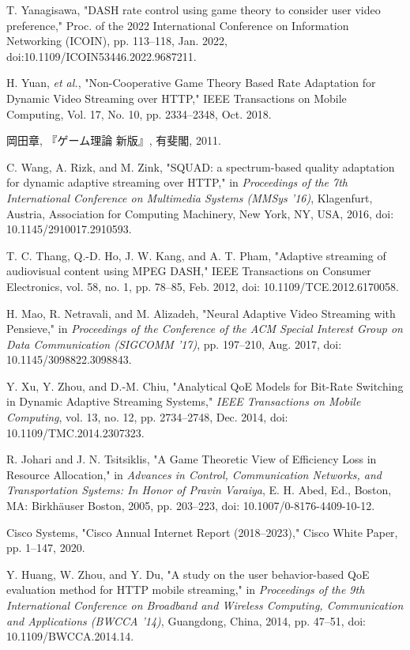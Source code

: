 \documentclass[a4paper,12pt,report]{jsbook}
\begin{document}
\begin{thebibliography}{99}
     T. Yanagisawa, "DASH rate control using game theory to consider user video preference," 
    Proc. of the 2022 International Conference on Information Networking (ICOIN), pp. 113--118, Jan. 2022, doi:10.1109/ICOIN53446.2022.9687211.

     H. Yuan, {\it et al.}, "Non-Cooperative Game Theory Based Rate Adaptation for Dynamic Video Streaming over HTTP," 
    IEEE Transactions on Mobile Computing, Vol. 17, No. 10, pp. 2334--2348, Oct. 2018.

     岡田章, 『ゲーム理論 新版』, 有斐閣, 2011.

     C. Wang, A. Rizk, and M. Zink, "SQUAD: a spectrum-based quality adaptation for dynamic adaptive streaming over HTTP," in \textit{Proceedings of the 7th International Conference on Multimedia Systems (MMSys '16)}, Klagenfurt, Austria, Association for Computing Machinery, New York, NY, USA, 2016, doi: 10.1145/2910017.2910593.

     T. C. Thang, Q.-D. Ho, J. W. Kang, and A. T. Pham, "Adaptive streaming of audiovisual content using MPEG DASH," 
    IEEE Transactions on Consumer Electronics, vol. 58, no. 1, pp. 78--85, Feb. 2012, doi: 10.1109/TCE.2012.6170058.

     H. Mao, R. Netravali, and M. Alizadeh, "Neural Adaptive Video Streaming with Pensieve," in \textit{Proceedings of the Conference of the ACM Special Interest Group on Data Communication (SIGCOMM '17)}, pp. 197--210, Aug. 2017, doi: 10.1145/3098822.3098843.

     Y. Xu, Y. Zhou, and D.-M. Chiu, "Analytical QoE Models for Bit-Rate Switching in Dynamic Adaptive Streaming Systems," \textit{IEEE Transactions on Mobile Computing}, vol. 13, no. 12, pp. 2734--2748, Dec. 2014, doi: 10.1109/TMC.2014.2307323.

     R. Johari and J. N. Tsitsiklis, "A Game Theoretic View of Efficiency Loss in Resource Allocation," in \textit{Advances in Control, Communication Networks, and Transportation Systems: In Honor of Pravin Varaiya}, E. H. Abed, Ed., Boston, MA: Birkhäuser Boston, 2005, pp. 203--223, doi: 10.1007/0-8176-4409-10-12.

     Cisco Systems, "Cisco Annual Internet Report (2018–2023)," Cisco White Paper, pp. 1--147, 2020.

     Y. Huang, W. Zhou, and Y. Du, "A study on the user behavior-based QoE evaluation method for HTTP mobile streaming," in \textit{Proceedings of the 9th International Conference on Broadband and Wireless Computing, Communication and Applications (BWCCA '14)}, Guangdong, China, 2014, pp. 47–51, doi: 10.1109/BWCCA.2014.14.
\end{thebibliography}
\end{document}

